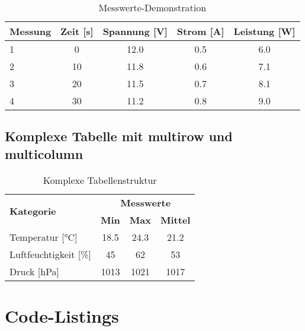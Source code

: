 \begin{table}[h]
	\centering
	\caption{Messwerte-Demonstration}
	\label{tab:messwerte}
	\begin{tabular}{|l|c|c|c|c|}
		\hline
		\textbf{Messung} & \textbf{Zeit [s]} & \textbf{Spannung [V]} & \textbf{Strom [A]} & \textbf{Leistung [W]} \\
		\hline
		1                & 0                 & 12.0                  & 0.5                & 6.0                   \\
		2                & 10                & 11.8                  & 0.6                & 7.1                   \\
		3                & 20                & 11.5                  & 0.7                & 8.1                   \\
		4                & 30                & 11.2                  & 0.8                & 9.0                   \\
		\hline
	\end{tabular}
\end{table}

\subsection{Komplexe Tabelle mit multirow und multicolumn}
\label{subsec:komplexe_tabelle}

\begin{table}[h]
	\centering
	\caption{Komplexe Tabellenstruktur}
	\label{tab:komplex}
	\begin{tabular}{|l|c|c|c|}
		\hline
		\multirow{2}{*}{\textbf{Kategorie}} & \multicolumn{3}{c|}{\textbf{Messwerte}}                                  \\
		\cline{2-4}
		                                    & \textbf{Min}                            & \textbf{Max} & \textbf{Mittel} \\
		\hline
		Temperatur [°C]                     & 18.5                                    & 24.3         & 21.2            \\
		Luftfeuchtigkeit [\%]               & 45                                      & 62           & 53              \\
		Druck [hPa]                         & 1013                                    & 1021         & 1017            \\
		\hline
	\end{tabular}
\end{table}

\section{Code-Listings}
\label{sec:code_listings}

